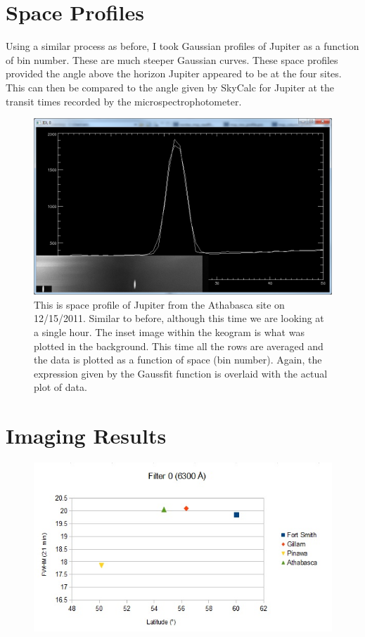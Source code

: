 \documentclass[11pt]{article}
\begin{document}
\section{Space Profiles}

Using a similar process as before, I took Gaussian profiles of Jupiter as a function of bin number. These are much steeper Gaussian curves. These space profiles provided the angle above the horizon Jupiter appeared to be at the four sites. This can then be compared to the angle given by SkyCalc for Jupiter at the transit times recorded by the microspectrophotometer. 



\begin{figure}[h!]
\includegraphics[scale=0.65]{spaceprofile_athabasca_1215.jpg}
\caption{This is space profile of Jupiter from the Athabasca site on 12/15/2011. Similar to before, although this time we are looking at a single hour. The inset image within the keogram is what was plotted in the background. This time all the rows are averaged and the data is plotted as a function of space (bin number). Again, the expression given by the Gaussfit function is overlaid with the actual plot of data.}
\end{figure}

\section{Imaging Results}

\begin{figure}[h!]
\includegraphics[scale=1.0]{filter0_FWHM.jpg}
\end{figure}
\end{document}
